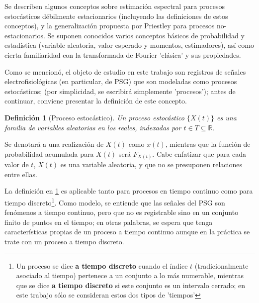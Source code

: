 \documentclass[12pt,a4paper]{mitthesis}
\newtheorem{defn}{Definici\'on}
\newcommand{\R}{\mathbb{R}}
\begin{document}
Se describen algunos conceptos sobre estimaci\'on espectral
para procesos estoc\'asticos d\'ebilmente estacionarios (incluyendo las definiciones 
de estos conceptos), y la generalizaci\'on propuesta por Priestley para procesos no-estacionarios. 
Se suponen conocidos varios 
conceptos b\'asicos de probabilidad y estad\'istica (variable aleatoria, 
valor esperado y momentos, estimadores),
as\'i como
cierta familiaridad con la transformada de Fourier 'cl\'asica' y
sus propiedades.%


Como se mencion\'o, el objeto de estudio en este trabajo son registros de se\~nales
electrofisiol\'ogicas (en particular, de PSG) que son modeladas como procesos estoc\'asticos;
(por simplicidad, se escribir\'a simplemente 'procesos');
antes de continuar, conviene presentar la definici\'on de este concepto. 

\begin{defn}[Proceso estoc\'astico]
Un proceso estoc\'astico $\{ X(t) \}$ es una familia de variables aleatorias en los reales, 
indexadas por $t \in T \subseteq \R$.
\label{proc_estocastico}
\end{defn}

Se denotar\'a a una
realizaci\'on de $X(t)$ como $x(t)$, mientras que la funci\'on
de probabilidad acumulada para $X(t)$ ser\'a 
$F_{X(t)}$. Cabe enfatizar que para cada valor de $t$, $X(t)$ es una variable 
aleatoria, y que no se presuponen relaciones entre ellas.

La definici\'on en \ref{proc_estocastico} es aplicable tanto para procesos
en tiempo continuo como para tiempo discreto\footnote{Un proceso se dice \textbf{a tiempo discreto} 
cuando el \'indice $t$ (tradicionalmente asociado al tiempo) pertenece a un conjunto a lo m\'as 
numerable, mientras que se dice \textbf{a tiempo discreto} si este conjunto es un intervalo cerrado;
en este trabajo s\'olo se consideran estos dos tipos de 'tiempos'}.
Como modelo, se entiende que las se\~nales del PSG son fen\'omenos a tiempo continuo, pero que no
es registrable sino en un conjunto finito de puntos en el tiempo; en otras palabras, se espera
que tenga caracter\'isticas propias de un proceso a tiempo continuo aunque en la pr\'actica
se trate con un proceso a tiempo discreto.
\end{document}
